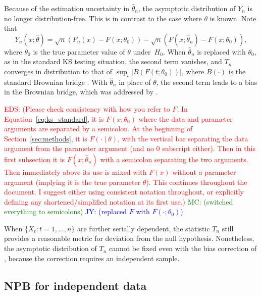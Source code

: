 \documentclass[APA,Times1COL]{WileyNJDv5} %
\newcommand{\jy}[1]{\textcolor{blue}{JY: (#1)}}
\newcommand{\eds}[1]{\textcolor{red}{EDS: (#1)}}
\newcommand{\mc}[1]{\textcolor{green}{MC: (#1)}}
\begin{document}
Because of the estimation uncertainty in $\hat\theta_n$, the asymptotic
distribution of $Y_n$ is no longer distribution-free. This is in contrast to the
case where $\theta$ is known.  Note that
\begin{equation*}
Y_n(x; \hat\theta) = \sqrt{n}(F_n(x) - F(x; \theta_0)) - 
\sqrt{n}(F(x; \hat\theta_n) - F(x; \theta_0)),
\end{equation*}
where $\theta_0$ is the true parameter value of $\theta$ under~$H_0$.
When $\hat\theta_n$ is replaced with $\theta_0$, as in the standard KS testing
situation, the second term vanishes, and $T_n$ converges in distribution to that
of $\sup_t | B(F(t; \theta_0)) |$, where $B(\cdot)$ is the standard Brownian bridge
\citep{kolmogorov1933sulla}. With $\hat\theta_n$ in place of $\theta$, the
second term leads to a bias in the Brownian bridge, which was addressed by
\citet{babu2004goodness}.

\eds{Please check consistency with how you refer to $F$.  In 
Equation~\eqref{eq:ks_standard}, it is $F(x; \theta_0)$ where the data and 
parameter arguments are separated by a semicolon.  At the beginning of 
Section~\ref{sec:methods}, it is $F(\cdot \mid \theta)$, with the vertical bar
separating the data argument from the parameter argument (and no 0 subscript
either).   Then in this first 
subsection it is $F(x; \hat\theta_n)$ with a semicolon separating the two 
arguments.  Then immediately above its use is mixed with $F(x)$ without a 
parameter argument (implying it is the true parameter $\theta$). This continues
throughout the document. I suggest either using consistent notation throughout, 
or explicitly defining any shortened/simplified notation at its first use.}
\mc{switched everything to semicolons}
\jy{replaced $F$ with $F(\cdot; \theta_0)$}

When $\{X_t: t = 1, \ldots, n\}$ are further serially dependent, the statistic
$T_n$ still provides a reasonable metric for deviation from the null
hypothesis. Nonetheless, the asymptotic distribution of $T_n$ cannot be fixed
even with the bias correction of \citet{babu2004goodness}, because the
correction requires an independent sample.

\subsection{NPB for independent data}
\end{document}
